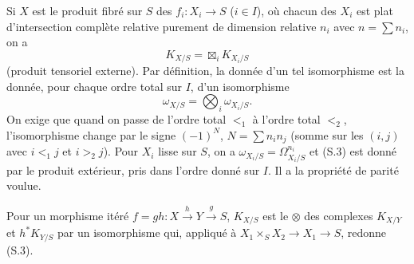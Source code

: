 \documentclass[11pt]{article}
\begin{document}
Si $X$ est le produit fibré sur $S$ des $f_i:X_i\to S$ ($i\in I$), où chacun des $X_i$ est plat d'intersection complète relative purement de dimension relative $n_i$ avec $n=\sum n_i$, on a
\begin{equation}
        K_{X/S}=\boxtimes_i K_{X_i/S} \tag{S.2}
\end{equation}
(produit tensoriel externe). Par définition, la donnée d'un tel isomorphisme est la donnée, pour chaque ordre total sur $I$, d'un isomorphisme
\begin{equation}
        \omega_{X/S}=\bigotimes_i\omega_{X_i/S}. \tag{S.3}
\end{equation}
On exige que quand on passe de l'ordre total $<_1$ à l'ordre total $<_2$, l'isomorphisme change par le signe $(-1)^N$, $N=\sum n_in_j$ (somme sur les $(i,j)$ avec $i<_1j$ et $i>_2j$). Pour $X_i$ lisse sur $S$, on a $\omega_{X_i/S}=\Omega^{n_i}_{X_i/S}$ et (S.3) est donné par le produit extérieur, pris dans l'ordre donné sur $I$. Il a la propriété de parité voulue.

Pour un morphisme itéré $f=gh:X\xrightarrow{h}Y\xrightarrow{g}S$, $K_{X/S}$ est le $\otimes$ des complexes $K_{X/Y}$ et $h^*K_{Y/S}$ par un isomorphisme qui, appliqué à $X_1\times_SX_2\to X_1\to S$, redonne (S.3).
\end{document}
